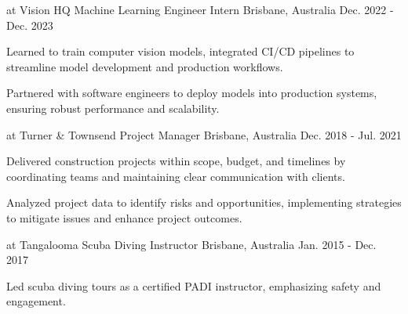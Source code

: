 \begin{cventries}
  \cventry
    {at Vision HQ} %
    {Machine Learning Engineer Intern} %
    {Brisbane, Australia} %
    {Dec. 2022 - Dec. 2023} %
    {
      \begin{cvitems} %
        \item {Learned to train computer vision models, integrated CI/CD pipelines to streamline model development and production workflows.}
        \item {Partnered with software engineers to deploy models into production systems, ensuring robust performance and scalability.}
      \end{cvitems}
    }

  \cventry
    {at Turner \& Townsend} %
    {Project Manager} %
    {Brisbane, Australia} %
    {Dec. 2018 - Jul. 2021} %
    {
      \begin{cvitems} %
        \item {Delivered construction projects within scope, budget, and timelines by coordinating teams and maintaining clear communication with clients.}
        \item {Analyzed project data to identify risks and opportunities, implementing strategies to mitigate issues and enhance project outcomes.} 
      \end{cvitems}
    }

  \cventry
    {at Tangalooma} %
    {Scuba Diving Instructor} %
    {Brisbane, Australia} %
    {Jan. 2015 - Dec. 2017} %
    {
      \begin{cvitems} %
        \item {Led scuba diving tours as a certified PADI instructor, emphasizing safety and engagement.}
      \end{cvitems}
    }

\end{cventries}
